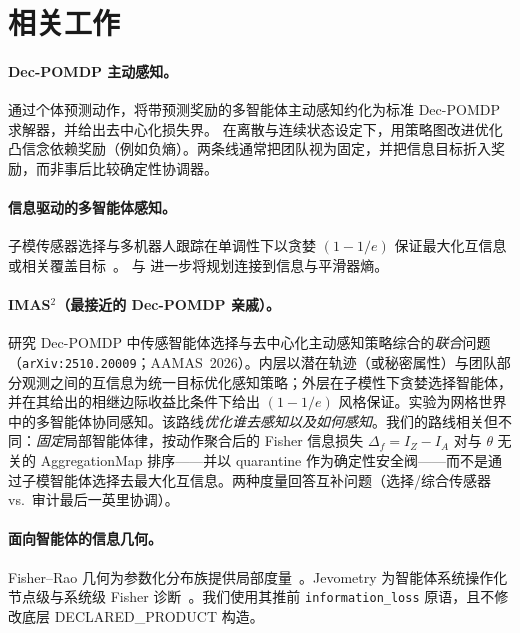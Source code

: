 \documentclass[11pt,a4paper]{article}
\begin{document}
\section{相关工作}
\label{sec:related}

\paragraph{Dec-POMDP 主动感知。}
\citet{lauri2020prediction} 通过个体预测动作，将带预测奖励的多智能体主动感知约化为标准 Dec-POMDP 求解器，并给出去中心化损失界。\citet{lauri2020decpomdp} 在离散与连续状态设定下，用策略图改进优化凸信念依赖奖励（例如负熵）。两条线通常把团队视为固定，并把信息目标折入奖励，而非事后比较确定性协调器。

\paragraph{信息驱动的多智能体感知。}
子模传感器选择与多机器人跟踪在单调性下以贪婪 $(1-1/e)$ 保证最大化互信息或相关覆盖目标~\citep{krause2008near,corah2021scalable}。\citet{olkin2024vulcan} 与 \citet{molloy2023smoother} 进一步将规划连接到信息与平滑器熵。

\paragraph{IMAS$^2$（最接近的 Dec-POMDP 亲戚）。}
\citet{shi2026imas2} 研究 Dec-POMDP 中传感智能体选择与去中心化主动感知策略综合的\emph{联合}问题（\texttt{arXiv:2510.20009}；AAMAS~2026）。内层以潜在轨迹（或秘密属性）与团队部分观测之间的互信息为统一目标优化感知策略；外层在子模性下贪婪选择智能体，并在其给出的相继边际收益比条件下给出 $(1-1/e)$ 风格保证。实验为网格世界中的多智能体协同感知。该路线\emph{优化谁去感知以及如何感知}。我们的路线相关但不同：\emph{固定}局部智能体律，按动作聚合后的 Fisher 信息损失 $\Delta_f=I_Z-I_A$ 对与 $\theta$ 无关的 AggregationMap 排序——并以 quarantine 作为确定性安全阀——而不是通过子模智能体选择去最大化互信息。两种度量回答互补问题（选择/综合传感器 vs.\ 审计最后一英里协调）。

\paragraph{面向智能体的信息几何。}
Fisher--Rao 几何为参数化分布族提供局部度量~\citep{amari2016information}。Jevometry 为智能体系统操作化节点级与系统级 Fisher 诊断~\citep{jevometry2026}。我们使用其推前 \texttt{information\_loss} 原语，且不修改底层 DECLARED\_PRODUCT 构造。
\end{document}
